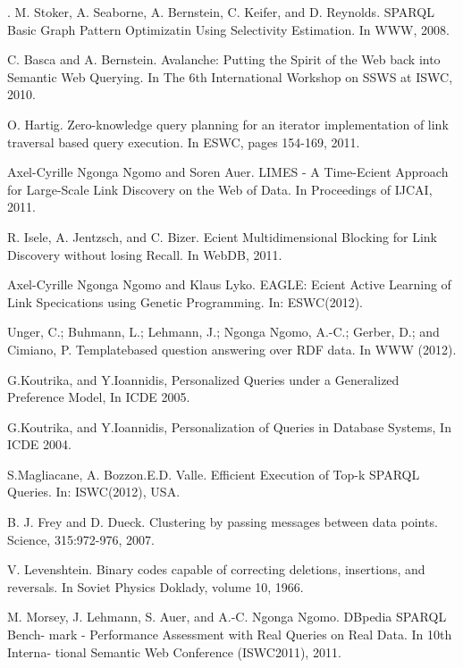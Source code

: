 \documentclass{sig-alternate}  %
\begin{document}
\begin{thebibliography}{10}
. M. Stoker, A. Seaborne, A. Bernstein, C. Keifer,
and D. Reynolds. SPARQL Basic Graph Pattern Optimizatin Using Selectivity
Estimation. In WWW, 2008.

C. Basca and A. Bernstein. Avalanche: Putting the
Spirit of the Web back into Semantic Web Querying. In The 6th International
Workshop on SSWS at ISWC, 2010.

O. Hartig. Zero-knowledge query planning for an iterator
implementation of link traversal based query execution. In ESWC, pages
154-169, 2011.

Axel-Cyrille Ngonga Ngomo and Soren Auer. LIMES -
A Time-Ecient Approach for Large-Scale Link Discovery on the Web of
Data. In Proceedings of IJCAI, 2011.

 R. Isele, A. Jentzsch, and C. Bizer. Ecient Multidimensional
Blocking for Link Discovery without losing Recall. In WebDB, 2011.

Axel-Cyrille Ngonga Ngomo and Klaus Lyko. EAGLE:
Ecient Active Learning of Link Specications using Genetic Programming.
In: ESWC(2012).

Unger, C.; Buhmann, L.; Lehmann, J.; Ngonga Ngomo,
A.-C.; Gerber, D.; and Cimiano, P. Templatebased question answering
over RDF data. In WWW (2012).

G.Koutrika, and Y.Ioannidis, Personalized Queries
under a Generalized Preference Model, In ICDE 2005.

G.Koutrika, and Y.Ioannidis, Personalization of Queries
in Database Systems, In ICDE 2004.

S.Magliacane, A. Bozzon.E.D. Valle. Efficient Execution
of Top-k SPARQL Queries. In: ISWC(2012), USA. 

B. J. Frey and D. Dueck. Clustering by passing messages
between data points. Science, 315:972-976, 2007.

 V. Levenshtein. Binary codes capable of correcting
deletions, insertions, and reversals. In Soviet Physics Doklady, volume
10, 1966.

M. Morsey, J. Lehmann, S. Auer, and A.-C. {Ngonga Ngomo}.
DBpedia SPARQL Bench- mark - Performance Assessment with Real Queries
on Real Data. In 10th Interna- tional Semantic Web Conference (ISWC2011),
2011.
\end{thebibliography}
\end{document}
